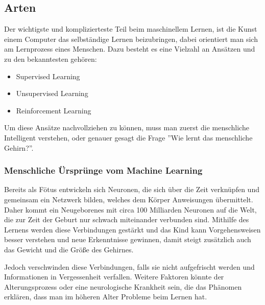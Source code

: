\subsection{Arten}

Der wichtigste und komplizierteste Teil beim maschinellem Lernen, ist die Kunst einem Computer das selbständige Lernen beizubringen, dabei orientiert man sich am Lernprozess eines Menschen. Dazu besteht es eine Vielzahl an Ansätzen und zu den bekanntesten gehören:

\begin{itemize}
    \item Supervised Learning
    \item Unsupervised Learning
    \item Reinforcement Learning
\end{itemize}

Um diese Ansätze nachvollziehen zu können, muss man zuerst die menschliche Intelligent verstehen, oder genauer gesagt die Frage ''Wie lernt das menschliche Gehirn?''. 

\subsubsection{Menschliche Ürsprünge vom Machine Learning}

Bereits als Fötus entwickeln sich Neuronen, die sich über die Zeit verknüpfen und gemeinsam ein Netzwerk bilden, welches dem Körper Anweisungen übermittelt. Daher kommt ein Neugeborenes mit circa 100 Milliarden Neuronen auf die Welt, die zur Zeit der Geburt nur schwach miteinander verbunden sind. Mithilfe des Lernens werden diese Verbindungen gestärkt und das Kind kann Vorgehensweisen besser verstehen und neue Erkenntnisse gewinnen, damit steigt zusätzlich auch das Gewicht und die Größe des Gehirnes. \cite{LANP}

Jedoch verschwinden diese Verbindungen, falls sie nicht aufgefrischt werden und Informationen in Vergessenheit verfallen. Weitere Faktoren könnte der Alterungsprozess oder eine neurologische Krankheit sein, die das Phänomen erklären, dass man im höheren Alter Probleme beim Lernen hat. \cite{GENTW}

